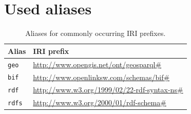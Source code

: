 \documentclass[a4paper]{scrartcl}
\newcommand{\textt}[1]{{\small \texttt{#1}}}
\begin{document}



\appendix

\section{Used aliases}

\begin{table}
  \centering
  \begin{tabular}{|l|l|}
    \hline
    \textbf{Alias} & \textbf{IRI prefix}\\
    \hline
    \hline
    \textt{geo}    & \url{http://www.opengis.net/ont/geosparql#}\\
    \hline
    \textt{bif}    & \url{http://www.openlinksw.com/schemas/bif#}\\
    \hline
    \textt{rdf}    & \url{http://www.w3.org/1999/02/22-rdf-syntax-ns#}\\
    \hline
    \textt{rdfs}   & \url{http://www.w3.org/2000/01/rdf-schema#}\\
    \hline
  \end{tabular}
  \caption{Aliases for commonly occurring IRI prefixes.}
  \label{tab:alias}
\end{table}
  
\end{document}

